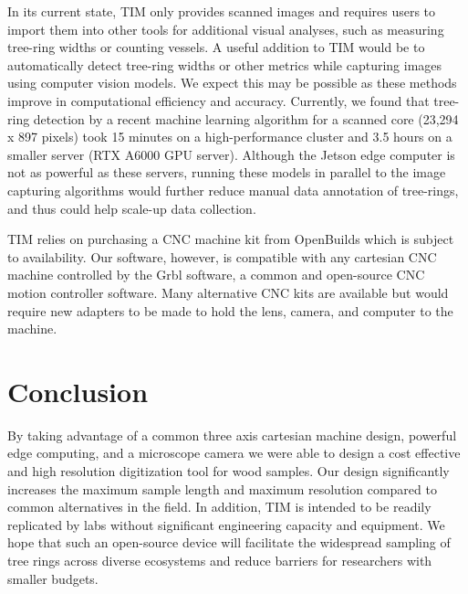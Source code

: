 \documentclass[a4paper,12pt]{article}
\begin{document}
In its current state, TIM only provides scanned images and requires users to import them into other tools for additional visual analyses, such as measuring tree-ring widths or counting vessels.
A useful addition to TIM would be to automatically detect tree-ring widths or other metrics while capturing images using computer vision models. We expect this may be possible as these methods improve in computational efficiency and accuracy. Currently, we found that tree-ring detection by a recent machine learning algorithm  \citep[R-CNN presented by][]{polacek_automation_2023} for a scanned core (23,294 x 897 pixels) took 15 minutes on a high-performance cluster and 3.5 hours on a smaller server (RTX A6000 GPU server). 
Although the Jetson edge computer is not as powerful as these servers, running these models in parallel to the image capturing algorithms would further reduce manual data annotation of tree-rings, and thus could help scale-up data collection.

TIM relies on purchasing a CNC machine kit from OpenBuilds which is subject to availability. Our software, however, is compatible with any cartesian CNC machine controlled by the Grbl software, a common and open-source CNC motion controller software.
Many alternative CNC kits are available but would require new adapters to be made to hold the lens, camera, and computer to the machine.

\section{Conclusion}  
By taking advantage of a common three axis cartesian machine design, powerful edge computing, and a microscope camera we were able to design a cost effective and high resolution digitization tool for wood samples. 
Our design significantly increases the maximum sample length and maximum resolution compared to common alternatives in the field. 
In addition, TIM is intended to be readily replicated by labs without significant engineering capacity and equipment. 
We hope that such an open-source device will facilitate the widespread sampling of tree rings across diverse ecosystems and reduce barriers for researchers with smaller budgets. 
\end{document}
